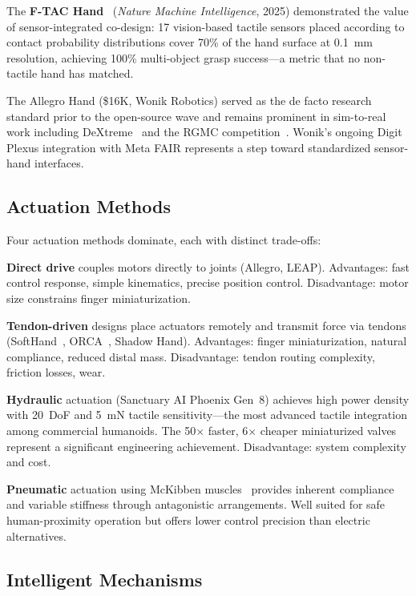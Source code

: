 The \textbf{F-TAC Hand}~\cite{zhao2025ftac} (\emph{Nature Machine Intelligence}, 2025) demonstrated the value of sensor-integrated co-design: 17 vision-based tactile sensors placed according to contact probability distributions cover 70\% of the hand surface at 0.1~mm resolution, achieving 100\% multi-object grasp success---a metric that no non-tactile hand has matched.

The Allegro Hand (\$16K, Wonik Robotics) served as the de facto research standard prior to the open-source wave and remains prominent in sim-to-real work including DeXtreme~\cite{handa2023dextreme} and the RGMC competition~\cite{yu2025rgmc}. Wonik's ongoing Digit Plexus integration with Meta FAIR represents a step toward standardized sensor-hand interfaces.

\subsection{Actuation Methods}

Four actuation methods dominate, each with distinct trade-offs:

\textbf{Direct drive} couples motors directly to joints (Allegro, LEAP). Advantages: fast control response, simple kinematics, precise position control. Disadvantage: motor size constrains finger miniaturization.

\textbf{Tendon-driven} designs place actuators remotely and transmit force via tendons (SoftHand~\cite{catalano2014softhand}, ORCA~\cite{christoph2025orca}, Shadow Hand). Advantages: finger miniaturization, natural compliance, reduced distal mass. Disadvantage: tendon routing complexity, friction losses, wear.

\textbf{Hydraulic} actuation (Sanctuary AI Phoenix Gen~8) achieves high power density with 20~DoF and 5~mN tactile sensitivity---the most advanced tactile integration among commercial humanoids. The 50$\times$ faster, 6$\times$ cheaper miniaturized valves represent a significant engineering achievement. Disadvantage: system complexity and cost.

\textbf{Pneumatic} actuation using McKibben muscles~\cite{alabeach2017vsa} provides inherent compliance and variable stiffness through antagonistic arrangements. Well suited for safe human-proximity operation but offers lower control precision than electric alternatives.

\subsection{Intelligent Mechanisms}
\label{sec:mechanisms}

